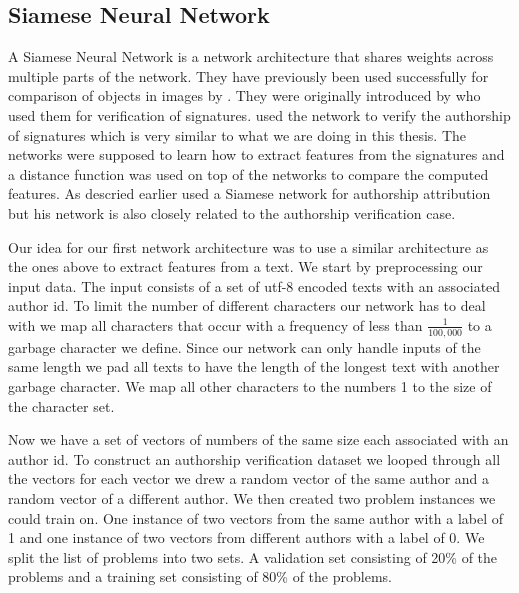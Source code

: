 \subsection{Siamese Neural Network}

A Siamese Neural Network is a network architecture that shares weights across
multiple parts of the network. They have previously been used successfully for
comparison of objects in images by \cite{Koch2015SiameseNN}. They were
originally introduced by \cite{NIPS1993_769} who used them for verification of
signatures. \cite{NIPS1993_769} used the network to verify the authorship of
signatures which is very similar to what we are doing in this thesis. The
networks were supposed to learn how to extract features from the signatures and
a distance function was used on top of the networks to compare the computed
features. As descried earlier \cite{qian:2018} used a Siamese network for
authorship attribution but his network is also closely related to the authorship
verification case.

Our idea for our first network architecture was to use a similar architecture as
the ones above to extract features from a text. We start by preprocessing our
input data. The input consists of a set of utf-8 encoded texts with an
associated author id. To limit the number of different characters our network
has to deal with we map all characters that occur with a frequency of less than
$\frac{1}{100,000}$ to a garbage character we define. Since our network can only
handle inputs of the same length we pad all texts to have the length of the
longest text with another garbage character. We map all other characters to the
numbers 1 to the size of the character set.

Now we have a set of vectors of numbers of the same size each associated with an
author id. To construct an authorship verification dataset we looped through all
the vectors for each vector we drew a random vector of the same author and a
random vector of a different author. We then created two problem instances we
could train on. One instance of two vectors from the same author with a label of
1 and one instance of two vectors from different authors with a label of 0. We
split the list of problems into two sets. A validation set consisting of 20\% of
the problems and a training set consisting of 80\% of the problems.


